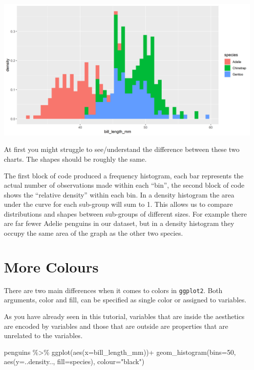 \documentclass[
]{book}
\newenvironment{Shaded}{\begin{snugshade}}{\end{snugshade}}
\newcommand{\AttributeTok}[1]{\textcolor[rgb]{0.77,0.63,0.00}{#1}}
\newcommand{\DecValTok}[1]{\textcolor[rgb]{0.00,0.00,0.81}{#1}}
\newcommand{\FunctionTok}[1]{\textcolor[rgb]{0.00,0.00,0.00}{#1}}
\newcommand{\NormalTok}[1]{#1}
\newcommand{\SpecialCharTok}[1]{\textcolor[rgb]{0.00,0.00,0.00}{#1}}
\newcommand{\StringTok}[1]{\textcolor[rgb]{0.31,0.60,0.02}{#1}}
\begin{document}
\includegraphics[width=0.8\linewidth]{images/density}

At first you might struggle to see/understand the difference between these two charts. The shapes should be roughly the same.

The first block of code produced a frequency histogram, each bar represents the actual number of observations made within each ``bin'', the second block of code shows the ``relative density'' within each bin. In a density histogram the area under the curve for each sub-group will sum to 1. This allows us to compare distributions and shapes between sub-groups of different sizes. For example there are far fewer Adelie penguins in our dataset, but in a density histogram they occupy the same area of the graph as the other two species.

\hypertarget{more-colours}{%
\section{More Colours}\label{more-colours}}

There are two main differences when it comes to colors in \texttt{ggplot2}. Both arguments, color and fill, can be specified as single color or
assigned to variables.

As you have already seen in this tutorial, variables that are inside the aesthetics are encoded by variables and those that are outside are properties that are unrelated to the variables.

\begin{Shaded}
\begin{Highlighting}[]
\NormalTok{penguins }\SpecialCharTok{\%\textgreater{}\%} 
    \FunctionTok{ggplot}\NormalTok{(}\FunctionTok{aes}\NormalTok{(}\AttributeTok{x=}\NormalTok{bill\_length\_mm))}\SpecialCharTok{+}
    \FunctionTok{geom\_histogram}\NormalTok{(}\AttributeTok{bins=}\DecValTok{50}\NormalTok{, }
                   \FunctionTok{aes}\NormalTok{(}\AttributeTok{y=}\NormalTok{..density..,}
                       \AttributeTok{fill=}\NormalTok{species), }
                   \AttributeTok{colour=}\StringTok{"black"}\NormalTok{)}
\end{Highlighting}
\end{Shaded}
\end{document}
